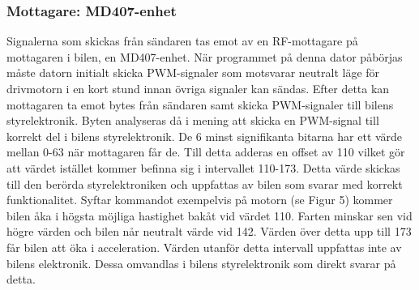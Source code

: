 \documentclass[a4paper]{article}
\begin{document}

\subsubsection{Mottagare: MD407-enhet}
Signalerna som skickas från sändaren tas emot av en RF-mottagare på mottagaren i bilen, en MD407-enhet. När programmet på denna dator påbörjas måste datorn initialt skicka PWM-signaler som motsvarar neutralt läge för drivmotorn i en kort stund innan övriga signaler kan sändas. Efter detta kan mottagaren ta emot bytes från sändaren samt skicka PWM-signaler till bilens styrelektronik. Byten analyseras då i mening att skicka en PWM-signal till korrekt del i bilens styrelektronik.  De 6 minst signifikanta bitarna har ett värde mellan 0-63 när mottagaren får de. Till detta adderas en offset av 110 vilket gör att värdet istället kommer befinna sig i intervallet 110-173. Detta värde skickas till den berörda styrelektroniken och uppfattas av bilen som svarar med korrekt funktionalitet. Syftar kommandot exempelvis på motorn (se Figur 5) kommer bilen åka i högsta möjliga hastighet bakåt vid värdet 110. Farten minskar sen vid högre värden och bilen når neutralt värde vid 142. Värden över detta upp till 173 får bilen att öka i acceleration. Värden utanför detta intervall uppfattas inte av bilens elektronik. Dessa omvandlas i bilens styrelektronik som direkt svarar på detta. 


\end{document}
